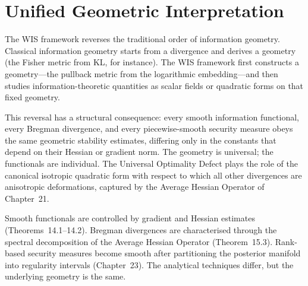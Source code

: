 \chapter[Unified Geometric Interpretation]{Unified Geometric Interpretation}

The WIS framework reverses the traditional order of information
geometry.  Classical information geometry starts from a divergence and
derives a geometry (the Fisher metric from KL, for instance).  The WIS
framework first constructs a geometry---the pullback metric from the
logarithmic embedding---and then studies information-theoretic
quantities as scalar fields or quadratic forms on that fixed geometry.

This reversal has a structural consequence: every smooth information
functional, every Bregman divergence, and every piecewise-smooth
security measure obeys the same geometric stability estimates,
differing only in the constants that depend on their Hessian or
gradient norm.  The geometry is universal; the functionals are
individual.  The Universal Optimality Defect plays the role of the
canonical isotropic quadratic form with respect to which all other
divergences are anisotropic deformations, captured by the Average
Hessian Operator of Chapter~21.

Smooth functionals are controlled by gradient and Hessian estimates
(Theorems~14.1--14.2).  Bregman divergences are characterised through
the spectral decomposition of the Average Hessian Operator
(Theorem~15.3).  Rank-based security measures become smooth after
partitioning the posterior manifold into regularity intervals
(Chapter~23).  The analytical techniques differ, but the underlying
geometry is the same.